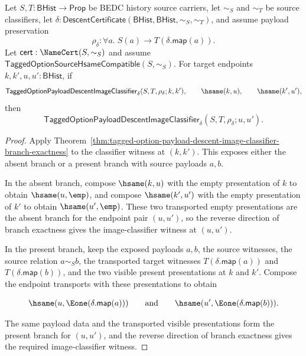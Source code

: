 \begin{theorem}
\label{thm:tagged-option-payload-descent-image-classifier-hsame-transport}
Let $S,T:\mathsf{BHist}\to\mathsf{Prop}$ be BEDC history source carriers, let
$\sim_S$ and $\sim_T$ be source classifiers, let
$\delta:\mathsf{DescentCertificate}(\mathsf{BHist},\mathsf{BHist},\sim_S,\sim_T)$,
and assume payload preservation
$$
\rho_{\delta}:\forall a.\;S(a)\to T(\delta.\mathsf{map}(a)).
$$
Let $\mathsf{cert}:\NameCert(S,\sim_S)$ and assume
$\mathsf{TaggedOptionSourceHsameCompatible}(S,\sim_S)$. For target endpoints
$k,k',u,u':\mathsf{BHist}$, if
$$
\mathsf{TaggedOptionPayloadDescentImageClassifier}_{\delta}
(S,T,\rho_{\delta};k,k'),
\qquad
\hsame(k,u),
\qquad
\hsame(k',u'),
$$
then
$$
\mathsf{TaggedOptionPayloadDescentImageClassifier}_{\delta}
(S,T,\rho_{\delta};u,u').
$$
\end{theorem}
\begin{proof}
Apply
Theorem~\ref{thm:tagged-option-payload-descent-image-classifier-branch-exactness}
to the classifier witness at $(k,k')$. This exposes either the absent branch or a
present branch with source payloads $a,b$.

In the absent branch, compose $\hsame(k,u)$ with the empty presentation of $k$ to
obtain $\hsame(u,\emp)$, and compose $\hsame(k',u')$ with the empty presentation
of $k'$ to obtain $\hsame(u',\emp)$. These two transported empty presentations
are the absent branch for the endpoint pair $(u,u')$, so the reverse direction of
branch exactness gives the image-classifier witness at $(u,u')$.

In the present branch, keep the exposed payloads $a,b$, the source witnesses,
the source relation $a\sim_S b$, the transported target witnesses
$T(\delta.\mathsf{map}(a))$ and $T(\delta.\mathsf{map}(b))$, and the two visible
present presentations at $k$ and $k'$. Compose the endpoint transports with
these presentations to obtain

$$
\hsame(u,\Eone(\delta.\mathsf{map}(a)))
\qquad\text{and}\qquad
\hsame(u',\Eone(\delta.\mathsf{map}(b))).
$$

The same payload data and the transported visible presentations form the present
branch for $(u,u')$, and the reverse direction of branch exactness gives the
required image-classifier witness.
\end{proof}

